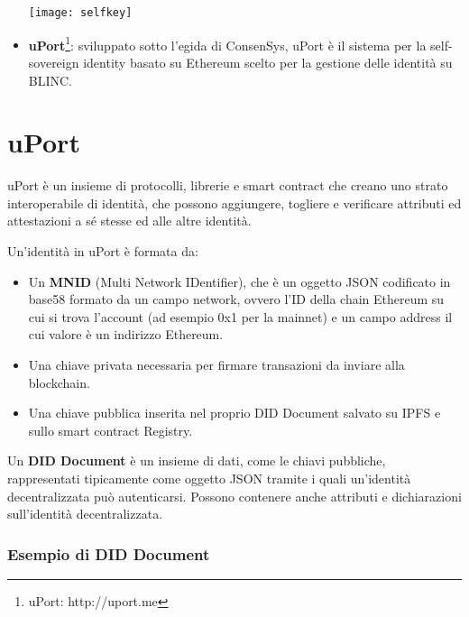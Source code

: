 \begin{itemize}
  \begin{center}
    \texttt{[image: selfkey]}
  \end{center}

\item \textbf{uPort}\footnote{uPort: http://uport.me}:
  sviluppato sotto l’egida di ConsenSys, uPort 
  è il sistema per la self-sovereign identity basato su Ethereum
  scelto per la gestione delle identità su BLINC.
\end{itemize}

\section{uPort}

uPort è un insieme di protocolli, librerie e smart contract che creano uno strato interoperabile di identità,
che possono aggiungere, togliere e verificare attributi ed attestazioni a sé stesse ed alle altre identità.

Un’identità in uPort è formata da:

\begin{itemize}
  \item Un \textbf{MNID} (Multi Network IDentifier), che è un oggetto JSON codificato in base58 formato da un campo network, ovvero l’ID della chain Ethereum su cui si trova l’account
  (ad esempio 0x1 per la mainnet) e un campo address il cui valore è un indirizzo Ethereum.
  \item Una chiave privata necessaria per firmare transazioni da inviare alla blockchain.
  \item Una chiave pubblica inserita nel proprio DID Document salvato su IPFS e sullo smart contract Registry.
\end{itemize}

Un \textbf{DID Document} è un insieme di dati, come le chiavi pubbliche, rappresentati tipicamente
come oggetto JSON tramite i quali un'identità decentralizzata può autenticarsi. 
Possono contenere anche attributi e dichiarazioni sull'identità decentralizzata. \cite{WEBSITE:1}

\subsubsection{Esempio di DID Document}

